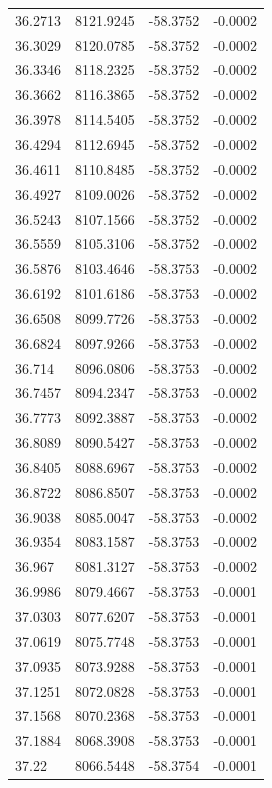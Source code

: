 \begin{table}[H]
\begin{tabular}{llll}
36.2713 & 8121.9245 & -58.3752 & -0.0002 \\
36.3029 & 8120.0785 & -58.3752 & -0.0002 \\
36.3346 & 8118.2325 & -58.3752 & -0.0002 \\
36.3662 & 8116.3865 & -58.3752 & -0.0002 \\
36.3978 & 8114.5405 & -58.3752 & -0.0002 \\
36.4294 & 8112.6945 & -58.3752 & -0.0002 \\
36.4611 & 8110.8485 & -58.3752 & -0.0002 \\
36.4927 & 8109.0026 & -58.3752 & -0.0002 \\
36.5243 & 8107.1566 & -58.3752 & -0.0002 \\
36.5559 & 8105.3106 & -58.3752 & -0.0002 \\
36.5876 & 8103.4646 & -58.3753 & -0.0002 \\
36.6192 & 8101.6186 & -58.3753 & -0.0002 \\
36.6508 & 8099.7726 & -58.3753 & -0.0002 \\
36.6824 & 8097.9266 & -58.3753 & -0.0002 \\
36.714 & 8096.0806 & -58.3753 & -0.0002 \\
36.7457 & 8094.2347 & -58.3753 & -0.0002 \\
36.7773 & 8092.3887 & -58.3753 & -0.0002 \\
36.8089 & 8090.5427 & -58.3753 & -0.0002 \\
36.8405 & 8088.6967 & -58.3753 & -0.0002 \\
36.8722 & 8086.8507 & -58.3753 & -0.0002 \\
36.9038 & 8085.0047 & -58.3753 & -0.0002 \\
36.9354 & 8083.1587 & -58.3753 & -0.0002 \\
36.967 & 8081.3127 & -58.3753 & -0.0002 \\
36.9986 & 8079.4667 & -58.3753 & -0.0001 \\
37.0303 & 8077.6207 & -58.3753 & -0.0001 \\
37.0619 & 8075.7748 & -58.3753 & -0.0001 \\
37.0935 & 8073.9288 & -58.3753 & -0.0001 \\
37.1251 & 8072.0828 & -58.3753 & -0.0001 \\
37.1568 & 8070.2368 & -58.3753 & -0.0001 \\
37.1884 & 8068.3908 & -58.3753 & -0.0001 \\
37.22 & 8066.5448 & -58.3754 & -0.0001 \\

\end{tabular}
\end{table}
